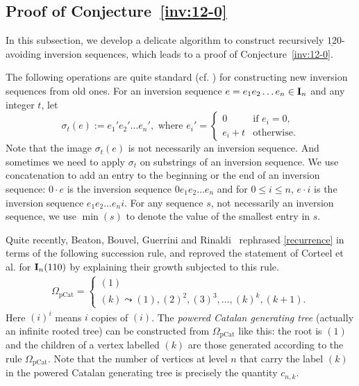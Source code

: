 \documentclass[12pt,A4]{amsart}
\numberwithin{equation}{section}
\theoremstyle{plain}
\theoremstyle{definition}
\def\I{\operatorname{{\bf I}}}
\begin{document}
\label{sec:3}

\subsection{Proof of Conjecture~\ref{inv:12-0}}
In this subsection, we develop a delicate algorithm to construct recursively $\underline{12}0$-avoiding inversion  sequences, which leads to a proof of Conjecture~\ref{inv:12-0}. 

The following operations are quite standard (cf. \cite{cor}) for constructing new inversion sequences from old ones.
For an inversion sequence $e=e_1e_2\ldots e_n\in\I_n$ and any integer $t$, let $$\sigma_t(e):=e_1'e_2'\ldots e_n', \text{ where }e_i'=\begin{cases}0 & \text{if $e_i=0$},\\
e_i+t & \text{otherwise}.\end{cases}$$
Note that the image $\sigma_t(e)$ is not necessarily an inversion sequence. And sometimes we need to apply $\sigma_t$ on substrings of an inversion sequence.
We use concatenation to add an entry to the beginning or the end of an inversion sequence: $0\cdot e$ is the inversion sequence $0e_1e_2\ldots e_n$ and for $0\le i\le n$, $e\cdot i$ is the inversion sequence $e_1e_2\ldots e_n i$. For any sequence $s$, not necessarily an inversion sequence, we use $\min(s)$ to denote the value of the smallest entry in $s$.


Quite recently, Beaton, Bouvel, Guerrini and Rinaldi~\cite[Prop.~19]{bbgr} rephrased \eqref{recurrence} in terms of the following succession rule, and reproved the statement of Corteel et al. for $\I_n(110)$ by explaining their growth subjected to this rule. 
\begin{align}\label{rule}
\Omega_{\mathrm{pCat}}=\begin{cases}
(1) \\
(k) \leadsto (1), (2)^2, (3)^3,\ldots,(k)^k,(k+1).
\end{cases}
\end{align}
Here $(i)^i$ means $i$ copies of $(i)$.
The {\em powered Catalan generating tree} (actually an infinite rooted tree) can be constructed from $\Omega_{\mathrm{pCat}}$ like this: the root is $(1)$ and the children of a vertex labelled $(k)$ are those generated according to the rule $\Omega_{\mathrm{pCat}}$. Note that the number of vertices  at level $n$ that carry the label $(k)$  in the powered Catalan generating tree is precisely the quantity $c_{n,k}$.  
\end{document}
